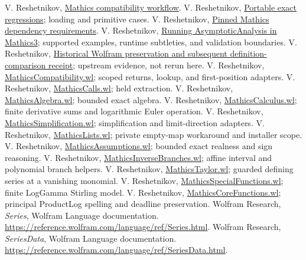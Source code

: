 \documentclass[11pt,letterpaper]{article}
\newcommand{\upstream}[2]{\href{https://github.com/VladimirReshetnikov/Asymptotic/blob/513917b5b387152256b14ac76d92dd30cd13a11d/#1}{#2}}
\begin{document}
\begin{thebibliography}{99}
 V. Reshetnikov, \upstream{.github/workflows/mathics.yml}{Mathics compatibility workflow}.
 V. Reshetnikov, \upstream{validation/MathicsTests.wl}{Portable exact regressions}; loading and primitive cases.
 V. Reshetnikov, \upstream{validation/requirements-mathics.txt}{Pinned Mathics dependency requirements}.
 V. Reshetnikov, \upstream{docs/Mathics/COMPATIBILITY.md}{Running AsymptoticAnalysis in Mathics3}; supported examples, runtime subtleties, and validation boundaries.
 V. Reshetnikov, \upstream{validation/mathics-wolfram-preservation.json}{Historical Wolfram preservation and subsequent definition-comparison receipt}; upstream evidence, not rerun here.
 V. Reshetnikov, \upstream{src/Kernel/MathicsCompatibility.wl}{MathicsCompatibility.wl}; scoped returns, lookup, and first-position adapters.
 V. Reshetnikov, \upstream{src/Kernel/MathicsCalls.wl}{MathicsCalls.wl}; held extraction.
 V. Reshetnikov, \upstream{src/Kernel/MathicsAlgebra.wl}{MathicsAlgebra.wl}; bounded exact algebra.
 V. Reshetnikov, \upstream{src/Kernel/MathicsCalculus.wl}{MathicsCalculus.wl}; finite derivative sums and logarithmic Euler operation.
 V. Reshetnikov, \upstream{src/Kernel/MathicsSimplification.wl}{MathicsSimplification.wl}; simplification and limit-direction adapters.
 V. Reshetnikov, \upstream{src/Kernel/MathicsLists.wl}{MathicsLists.wl}; private empty-map workaround and installer scope.
 V. Reshetnikov, \upstream{src/Kernel/MathicsAssumptions.wl}{MathicsAssumptions.wl}; bounded exact realness and sign reasoning.
 V. Reshetnikov, \upstream{src/Kernel/MathicsInverseBranches.wl}{MathicsInverseBranches.wl}; affine interval and polynomial branch helpers.
 V. Reshetnikov, \upstream{src/Kernel/MathicsTaylor.wl}{MathicsTaylor.wl}; guarded defining series at a vanishing monomial.
 V. Reshetnikov, \upstream{src/Kernel/MathicsSpecialFunctions.wl}{MathicsSpecialFunctions.wl}; finite LogGamma Stirling model.
 V. Reshetnikov, \upstream{src/Kernel/MathicsCoreFunctions.wl}{MathicsCoreFunctions.wl}; principal ProductLog spelling and deadline preservation.
 Wolfram Research, \emph{Series}, Wolfram Language documentation. \url{https://reference.wolfram.com/language/ref/Series.html}.
 Wolfram Research, \emph{SeriesData}, Wolfram Language documentation. \url{https://reference.wolfram.com/language/ref/SeriesData.html}.

\end{thebibliography}
\end{document}
